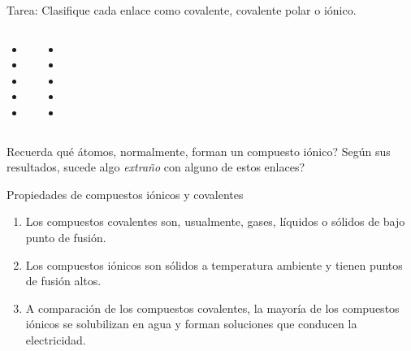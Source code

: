 \documentclass{beamer}
\begin{document}
\begin{frame}{Tarea:}
  Clasifique cada enlace como covalente, covalente polar o iónico.
  \begin{columns}
      \begin{itemize}
      \item {}
      \item {}
      \item {}
      \item {}
      \item {}
      \end{itemize}
    \begin{itemize}
      \item {}
      \item {}
      \item {}
      \item {}
      \item {}
    \end{itemize}
  \end{columns}
Recuerda qué átomos, normalmente, forman un compuesto iónico? Según sus resultados, sucede algo \emph{extraño} con alguno de estos enlaces?
\end{frame}
\begin{frame}{Propiedades de compuestos iónicos y covalentes}
  \begin{enumerate}
    \item Los compuestos covalentes son, usualmente, gases, líquidos o sólidos de bajo punto de fusión. 
    \item Los compuestos iónicos son sólidos a temperatura ambiente y tienen puntos de fusión altos.
    \item  A comparación de los compuestos covalentes, la mayoría de los compuestos iónicos se solubilizan en agua y forman soluciones que conducen la electricidad. 
  \end{enumerate}
\end{frame}
\end{document}

